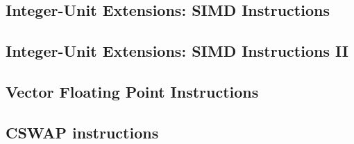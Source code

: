 \subsection{Integer-Unit Extensions: SIMD Instructions}
\label{sec:integer-unit-extns:simd-instructions:impl}



\subsection{Integer-Unit Extensions: SIMD Instructions II}
\label{sec:integer-unit-extns:simd-instructions:2:impl}

\subsection{Vector Floating Point Instructions}
\label{sec:vector-floating-point-instructions:impl}

\subsection{CSWAP instructions}
\label{sec:cswap-instructions:impl}


